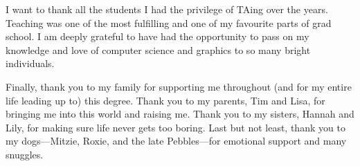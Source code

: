 I want to thank all the students I had the privilege of TAing over the years.
Teaching was one of the most fulfilling and one of my favourite parts of grad school.
I am deeply grateful to have had the opportunity to pass on my knowledge and love of computer science and graphics to so many bright individuals.


Finally, thank you to my family for supporting me throughout (and for my entire life leading up to) this degree.
Thank you to my parents, Tim and Lisa, for bringing me into this world and raising me.
Thank you to my sisters, Hannah and Lily, for making sure life never gets too boring.
Last but not least, thank you to my dogs---Mitzie, Roxie, and the late Pebbles---for emotional support and many snuggles.


\begin{singlespace}
\newpage
{}
\tableofcontents
\pagestyle{plain}
\newpage
{}
\listoftables
\pagestyle{plain}
\newpage
{}
\listoffigures
\pagestyle{plain}
\clearpage
\clearpage          %
\end{singlespace}
